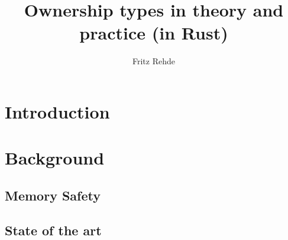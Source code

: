 \documentclass[sigplan,11pt,nonacm]{acmart}
\begin{document}
\title{Ownership types in theory and practice (in Rust)}
\author{Fritz Rehde}

\begin{abstract}


\end{abstract}


\maketitle

\section{Introduction}
\label{sec:introduction}


\section{Background}
\label{sec:background}

\subsection{Memory Safety}



\subsection{State of the art}




\end{document}
